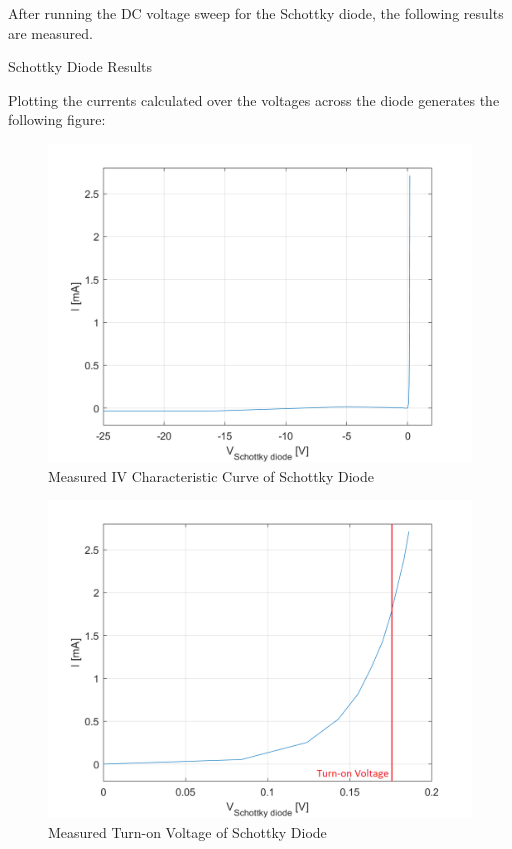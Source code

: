 After running the DC voltage sweep for the Schottky diode, the following results are measured.

\FloatBarrier

\begin{table}[h!]
	\centering
	\caption{Schottky Diode Results}
	\label{tab:schottky-results}
\end{table}

\FloatBarrier

Plotting the currents calculated over the voltages across the diode generates the following figure:

\FloatBarrier

\begin{figure}[h!]
	\centering
	\includegraphics[scale=0.4]{../images/schottky_diode.PNG}
	\caption{Measured IV Characteristic Curve of Schottky Diode}
	\label{fig:schottky_measured}
\end{figure}

\begin{figure}[h!]
	\centering
	\includegraphics[scale=0.4]{../images/schottky_diode_turn_on.PNG}
	\caption{Measured Turn-on Voltage of Schottky Diode}
	\label{fig:schottky_turn_on}
\end{figure}

